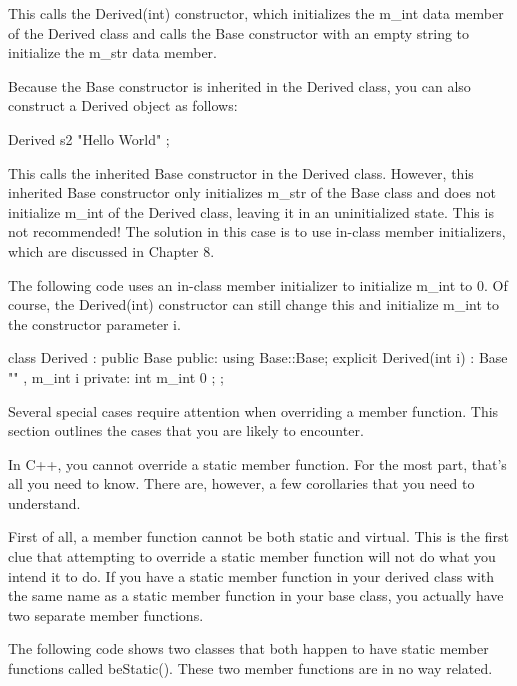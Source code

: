 This calls the Derived(int) constructor, which initializes the m\_int data member of the Derived class and calls the Base constructor with an empty string to initialize the m\_str data member.

Because the Base constructor is inherited in the Derived class, you can also construct a Derived object as follows:

\begin{cpp}
Derived s2 { "Hello World" };
\end{cpp}

This calls the inherited Base constructor in the Derived class. However, this inherited Base constructor only initializes m\_str of the Base class and does not initialize m\_int of the Derived class, leaving it in an uninitialized state. This is not recommended! The solution in this case is to use in-class member initializers, which are discussed in Chapter 8.

The following code uses an in-class member initializer to initialize m\_int to 0. Of course, the Derived(int) constructor can still change this and initialize m\_int to the constructor parameter i.

\begin{cpp}
class Derived : public Base
{
    public:
        using Base::Base;
        explicit Derived(int i) : Base { "" }, m_int { i } {}
    private:
        int m_int { 0 };
};
\end{cpp}


Several special cases require attention when overriding a member function. This section outlines the cases that you are likely to encounter.


In C++, you cannot override a static member function. For the most part, that’s all you need to know. There are, however, a few corollaries that you need to understand.

First of all, a member function cannot be both static and virtual. This is the first clue that attempting to override a static member function will not do what you intend it to do. If you have a static member function in your derived class with the same name as a static member function in your base class, you actually have two separate member functions.

The following code shows two classes that both happen to have static member functions called beStatic(). These two member functions are in no way related.

